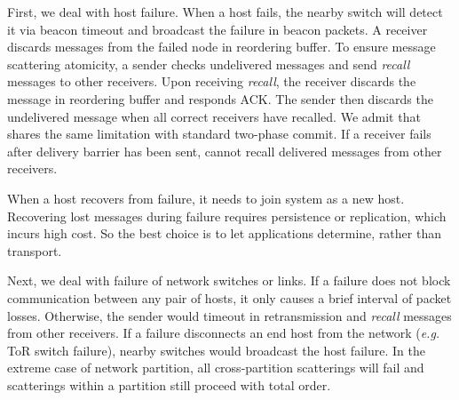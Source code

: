 {First, we deal with host failure.
When a host fails, the nearby switch will detect it via beacon timeout and broadcast the failure in beacon packets.
A receiver discards messages from the failed node in reordering buffer.
To ensure message scattering atomicity, a sender checks undelivered messages and send \textit{recall} messages to other receivers.
Upon receiving \textit{recall}, the receiver discards the message in reordering buffer and responds ACK.
The sender then discards the undelivered message when all correct receivers have recalled.
We admit that \sys shares the same limitation with standard two-phase commit.
If a receiver fails after delivery barrier has been sent, \sys cannot recall delivered messages from other receivers.

When a host recovers from failure, it needs to join \sys system as a new host.
Recovering lost messages during failure requires persistence or replication, which incurs high cost. So the best choice is to let applications determine, rather than \sys transport.

Next, we deal with failure of network switches or links.
If a failure does not block communication between any pair of hosts, it only causes a brief interval of packet losses.
Otherwise, the sender would timeout in retransmission and \textit{recall} messages from other receivers.
If a failure disconnects an end host from the network (\textit{e.g.} ToR switch failure), nearby switches would broadcast the host failure.
In the extreme case of network partition, all cross-partition scatterings will fail and scatterings within a partition still proceed with total order.


}
